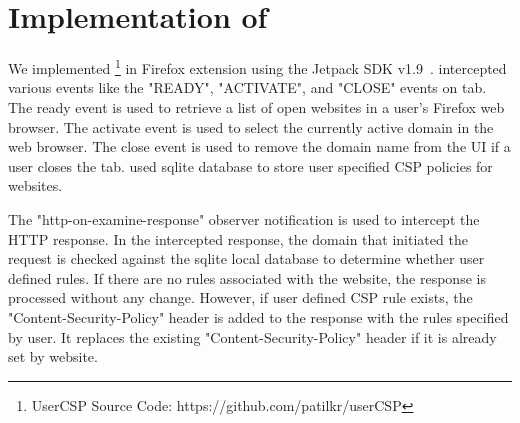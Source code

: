 \section {Implementation of \codename}
\label{sec:imp}

We implemented \codename \footnote[1]{UserCSP Source Code:
  https://github.com/patilkr/userCSP} in Firefox extension using the
Jetpack SDK v1.9~\cite{JetPack-SDK}. \Codename intercepted various events like the "READY",
"ACTIVATE", and "CLOSE" events on tab. The ready event is used to
retrieve a list of open websites in a user's Firefox web browser. The
activate event is used to select the currently active domain in the
web browser. The close event is used to remove the domain name from
the UI if a user closes the tab. \Codename used sqlite database to
store user specified CSP policies for websites.

The "http-on-examine-response" observer notification is used to
intercept the HTTP response. In the intercepted response, the domain
that initiated the request is checked against the sqlite local
database to determine whether user defined rules. If there are no
rules associated with the website, the response is processed without
any change. However, if user defined CSP rule exists, the
"Content-Security-Policy" header is added to the response with the
rules specified by user. It replaces the existing
"Content-Security-Policy" header if it is already set by website.


